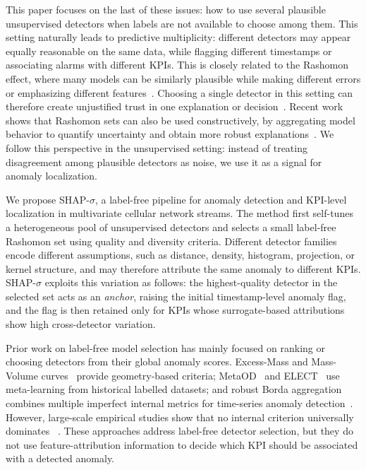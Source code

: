 \documentclass[conference]{IEEEtran}
\begin{document}
This paper focuses on the last of these issues: how to use several
plausible unsupervised detectors when labels are not available to choose
among them. This setting naturally leads to predictive multiplicity:
different detectors may appear equally reasonable on the same data,
while flagging different timestamps or associating alarms with different
KPIs. This is closely related to the Rashomon effect, where many models
can be similarly plausible while making different errors or emphasizing
different features~\cite{Breiman2001,Semenova2022,Fisher2019}.
Choosing
a single detector in this setting can therefore create unjustified trust
in one explanation or decision~\cite{cavus2025investigating}. Recent
work shows that Rashomon sets can also be used constructively, by
aggregating model behavior to quantify uncertainty and obtain more
robust explanations~\cite{cavus2026quantifying}. We follow this
perspective in the unsupervised setting: instead of treating
disagreement among plausible detectors as noise, we use it as a signal
for anomaly localization. 

We propose SHAP-$\sigma$, a label-free pipeline for anomaly
detection and KPI-level localization in multivariate cellular network
streams. The method first self-tunes a heterogeneous pool of
unsupervised detectors and selects a small label-free Rashomon set using
quality and diversity criteria. Different detector families encode
different assumptions, such as distance, density, histogram, projection,
or kernel structure, and may therefore attribute the same anomaly to
different KPIs. SHAP-$\sigma$ exploits this variation as follows: the
highest-quality detector in the selected set acts as an \emph{anchor},
raising the initial timestamp-level anomaly flag, and the flag is then
retained only for KPIs whose surrogate-based attributions~\cite{Lundberg2017,Lundberg2020} show
high cross-detector variation.

Prior work on label-free model selection has mainly focused on ranking
or choosing detectors from their global anomaly scores. Excess-Mass and
Mass-Volume curves~\cite{Goix2016} provide geometry-based criteria;
MetaOD~\cite{Zhao2021} and ELECT~\cite{Zhao2022} use meta-learning from
historical labelled datasets; and robust Borda aggregation combines
multiple imperfect internal metrics for time-series anomaly
detection~\cite{Goswami2023}. However, large-scale empirical studies
show that no internal criterion universally dominates
~\cite{MaZhao2023}. These approaches address label-free detector
selection, but they do not use feature-attribution information to decide
which KPI should be associated with a detected anomaly.
\end{document}
